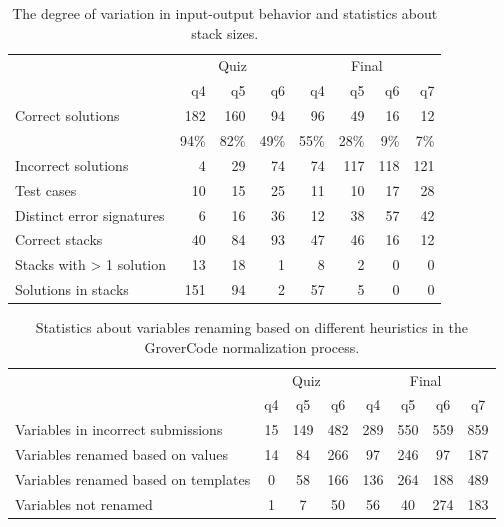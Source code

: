 \documentclass[12pt,twoside]{mitthesis}
\begin{document}
\begin{table}[!ht]
\centering
\begin{tabular}{l r|r|r|r|r|r|r}
& \multicolumn{3}{c}{Quiz} & \multicolumn{4}{c}{Final} \\
& q4 & q5 & q6 & q4 & q5 & q6 & q7 \\
\hline
Correct solutions & 182 & 160 & 94 & 96 & 49 & 16 & 12 \\
 & 94\% & 82\% & 49\% & 55\% & 28\% & 9\% & 7\% \\
\hline
Incorrect solutions & 4 & 29 & 74 & 74 & 117 & 118 & 121 \\
\hline
Test cases & 10 & 15 & 25 & 11 & 10 & 17 & 28 \\
\hline
Distinct error signatures & 6 & 16 & 36 & 12 & 38 & 57 & 42 \\
\hline
Correct stacks & 40 & 84 & 93 & 47 & 46 & 16 & 12 \\
\hline
Stacks with > 1 solution & 13 & 18 & 1 & 8 & 2 & 0 & 0 \\
\hline
Solutions in stacks & 151 & 94 & 2 & 57 & 5 & 0 & 0 \\
\end{tabular}
\caption{The degree of variation in input-output behavior and statistics about stack sizes.}
\label{table:cluster_stats}
\end{table}

\begin{table}
\centering
\begin{tabular}{l c|c|c|c|c|c|c}
& \multicolumn{3}{c}{Quiz} & \multicolumn{4}{c}{Final} \\
& q4 & q5 & q6 & q4 & q5 & q6 & q7 \\
\hline
Variables in incorrect submissions & 15 & 149 & 482 & 289 & 550 & 559 & 859 \\
\hline
Variables renamed based on values & 14 & 84 & 266 & 97 & 246 & 97 & 187 \\
\hline
Variables renamed based on templates & 0 & 58 & 166 & 136 & 264 & 188 & 489 \\
\hline
Variables not renamed & 1 & 7 & 50 & 56 & 40 & 274 & 183 \\
\end{tabular}
\caption{Statistics about variables renaming based on different heuristics in the GroverCode normalization process.}
\label{table:renametype}
\end{table}
\end{document}
